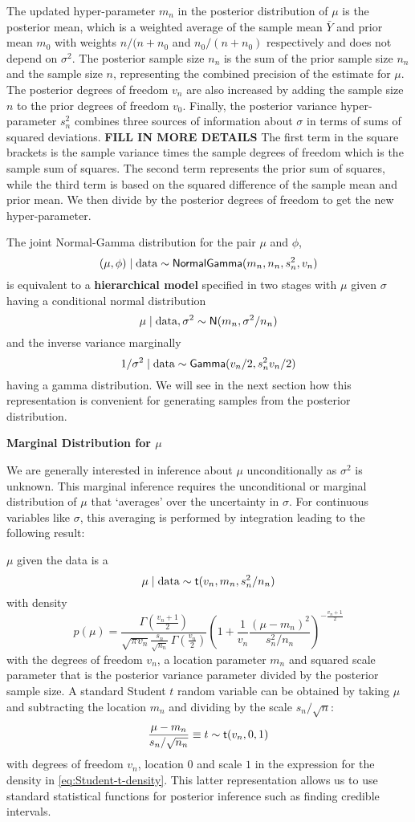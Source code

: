 \documentclass[]{book}
\theoremstyle{definition}
\theoremstyle{definition}
\theoremstyle{remark}
\begin{document}
The updated hyper-parameter \(m_n\) in the posterior distribution of
\(\mu\) is the posterior mean, which is a weighted average of the sample
mean \(\bar{Y}\) and prior mean \(m_0\) with weights \(n/(n + n_0\) and
\(n_0/(n + n_0)\) respectively and does not depend on \(\sigma^2\). The
posterior sample size \(n_n\) is the sum of the prior sample size
\(n_n\) and the sample size \(n\), representing the combined precision
of the estimate for \(\mu\). The posterior degrees of freedom \(v_n\)
are also increased by adding the sample size \(n\) to the prior degrees
of freedom \(v_0\). Finally, the posterior variance hyper-parameter
\(s^2_n\) combines three sources of information about \(\sigma\) in
terms of sums of squared deviations. \textbf{FILL IN MORE DETAILS} The
first term in the square brackets is the sample variance times the
sample degrees of freedom which is the sample sum of squares. The second
term represents the prior sum of squares, while the third term is based
on the squared difference of the sample mean and prior mean. We then
divide by the posterior degrees of freedom to get the new
hyper-parameter.

The joint Normal-Gamma distribution for the pair \(\mu\) and \(\phi\),
\[(\mu, \phi) \mid \text{data} \sim \textsf{NormalGamma}(m_n, n_n, s^2_n, v_n)\] is
equivalent to a \textbf{hierarchical model} specified in two stages with
\(\mu\) given \(\sigma\) having a conditional normal distribution
\[\mu \mid \text{data}, \sigma^2  \sim  \textsf{N}(m_n, \sigma^2/n_n)\] and the
inverse variance marginally \[
1/\sigma^2 \mid \text{data}   \sim   \textsf{Gamma}(v_n/2, s^2_n v_n/2) 
\] having a gamma distribution. We will see in the next section how this
representation is convenient for generating samples from the posterior
distribution.

\textbf{Marginal Distribution for \(\mu\)}

We are generally interested in inference about \(\mu\) unconditionally
as \(\sigma^2\) is unknown. This marginal inference requires the
unconditional or marginal distribution of \(\mu\) that `averages' over
the uncertainty in \(\sigma\). For continuous variables like \(\sigma\),
this averaging is performed by integration leading to the following
result:

\(\mu\) given the data is a 
\[ \mu \mid \text{data} \sim \textsf{t}(v_n, m_n, s^2_n/n_n)  \] with density \[
p(\mu) =\frac{\Gamma\left(\frac{v_n + 1}{2} \right)}
{\sqrt{\pi v_n} \frac{s_n}{\sqrt{n_n}} \,\Gamma\left(\frac{v_n}{2} \right)}
\left(1 + \frac{1}{v_n}\frac{(\mu - m_n)^2} {s^2_n/n_n} \right)^{-\frac{v_n+1}{2}} 
\label{eq:Student-t-density}
\] with the degrees of freedom \(v_n\), a location parameter \(m_n\) and
squared scale parameter that is the posterior variance parameter divided
by the posterior sample size. A standard Student \(t\) random variable
can be obtained by taking \(\mu\) and subtracting the location \(m_n\)
and dividing by the scale \(s_n/\sqrt{n}\):
\[ \frac{\mu - m_n}{s_n/\sqrt{n_n}} \equiv t \sim \textsf{t}(v_n, 0 , 1)  \]
with degrees of freedom \(v_n\), location \(0\) and scale \(1\) in the
expression for the density in \eqref{eq:Student-t-density}. This latter
representation allows us to use standard statistical functions for
posterior inference such as finding credible intervals.
\end{document}
